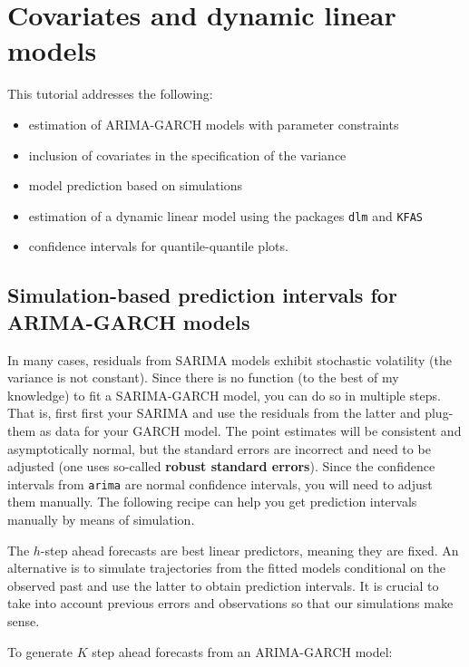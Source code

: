 \documentclass[]{book}
\providecommand{\tightlist}{%
  \setlength{\itemsep}{0pt}\setlength{\parskip}{0pt}}
\begin{document}
\chapter{Covariates and dynamic linear
models}\label{covariates-and-dynamic-linear-models}

This tutorial addresses the following:

\begin{itemize}
\tightlist
\item
  estimation of ARIMA-GARCH models with parameter constraints
\item
  inclusion of covariates in the specification of the variance
\item
  model prediction based on simulations
\item
  estimation of a dynamic linear model using the packages \texttt{dlm}
  and \texttt{KFAS}
\item
  confidence intervals for quantile-quantile plots.
\end{itemize}

\section{Simulation-based prediction intervals for ARIMA-GARCH
models}\label{simulation-based-prediction-intervals-for-arima-garch-models}

In many cases, residuals from SARIMA models exhibit stochastic
volatility (the variance is not constant). Since there is no function
(to the best of my knowledge) to fit a SARIMA-GARCH model, you can do so
in multiple steps. That is, first first your SARIMA and use the
residuals from the latter and plug-them as data for your GARCH model.
The point estimates will be consistent and asymptotically normal, but
the standard errors are incorrect and need to be adjusted (one uses
so-called \textbf{robust standard errors}). Since the confidence
intervals from \texttt{arima} are normal confidence intervals, you will
need to adjust them manually. The following recipe can help you get
prediction intervals manually by means of simulation.

The \(h\)-step ahead forecasts are best linear predictors, meaning they
are fixed. An alternative is to simulate trajectories from the fitted
models conditional on the observed past and use the latter to obtain
prediction intervals. It is crucial to take into account previous errors
and observations so that our simulations make sense.

To generate \(K\) step ahead forecasts from an ARIMA-GARCH model:
\end{document}
